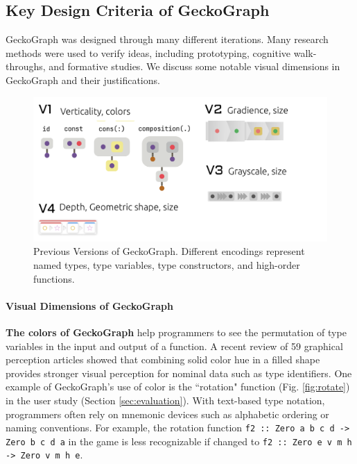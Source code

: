 \documentclass[preprint,12pt]{elsarticle}
\begin{document}
\subsection{Key Design Criteria of GeckoGraph}\label{sec:benefits}

GeckoGraph was designed through many different iterations. Many research methods were used to verify ideas, including prototyping, cognitive walk-throughs, and formative studies. We discuss some notable visual dimensions in GeckoGraph and their justifications.

\begin{figure}[]
  \includegraphics[width=\linewidth]{figures/PreviousVersions}
  \caption{\label{fig:previous}Previous Versions of GeckoGraph. Different encodings represent named types, type variables, type constructors, and high-order functions.}
\end{figure}

\paragraph{Visual Dimensions of GeckoGraph}
\textbf{The colors of GeckoGraph} help programmers to see the permutation of type variables in the input and output of a function. A recent review \cite{Zeng2023-jz} of 59 graphical perception articles showed that combining solid color hue in a filled shape provides stronger visual perception for nominal data such as type identifiers. One example of GeckoGraph's use of color is the ``rotation" function  (Fig. \ref{fig:rotate}) in the user study (Section \ref{sec:evaluation}). With text-based type notation, programmers often rely on mnemonic devices such as alphabetic ordering or naming conventions. For example, the rotation function \texttt{f2 :: Zero a b c d -> Zero b c d a} in the game is less recognizable if changed to \texttt{f2 :: Zero e v m h -> Zero v m h e}. 
\end{document}

